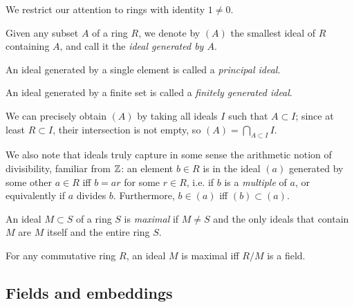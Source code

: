 We restrict our attention to rings with identity $1\neq 0$.

\begin{defn}
	Given any subset $A$ of a ring $R$, we denote by $(A)$ the smallest ideal of $R$ containing $A$, and call it the \emph{ideal generated by $A$}.

	An ideal generated by a single element is called a \emph{principal ideal}.

	An ideal generated by a finite set is called a \emph{finitely generated ideal}.
\end{defn}

We can precisely obtain $(A)$ by taking all ideals $I$ such that $A\subset I$; since at least $R\subset I$, their intersection is not empty, so $(A)=\bigcap_{A\subset I} I$.

We also note that ideals truly capture in some sense the arithmetic notion of divisibility, familiar from $\mathbb{Z}$: an element $b\in R$ is in the ideal $(a)$ generated by some other $a\in R$ iff $b=ar$ for some $r\in R$, i.e. if $b$ is a \emph{multiple} of $a$, or equivalently if $a$ divides $b$. Furthermore, $b\in(a)$ iff $(b)\subset(a)$.

\begin{defn}
	An ideal $M\subset S$ of a ring $S$ is \emph{maximal} if $M\neq S$ and the only ideals that contain $M$ are $M$ itself and the entire ring $S$.
\end{defn}

\begin{prop}
	For any commutative ring $R$, an ideal $M$ is maximal iff $R/M$ is a field.
\end{prop}




\subsection{Fields and embeddings}








